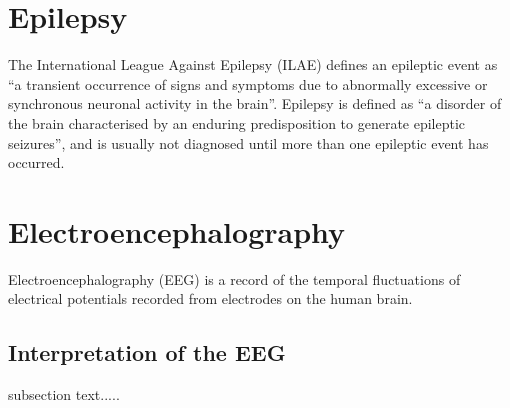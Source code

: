 \section{Epilepsy}
\label{sec:epilepsy}

The International League Against Epilepsy (ILAE) defines an epileptic event as ``a transient occurrence of signs and symptoms due to abnormally excessive or synchronous neuronal activity in the brain''\cite{Fisher_2005_DefinitionsfromILAE}.  Epilepsy is defined as ``a disorder of the brain characterised by an enduring predisposition to generate epileptic seizures''\cite{Fisher_2005_DefinitionsfromILAE}, and is usually not diagnosed until more than one epileptic event has occurred.\\     



\section{Electroencephalography}
\label{sec:eeg}

Electroencephalography (EEG) is a record of the temporal fluctuations of electrical potentials recorded from electrodes on the human brain. \\


\subsection{Interpretation of the EEG}

subsection text.....